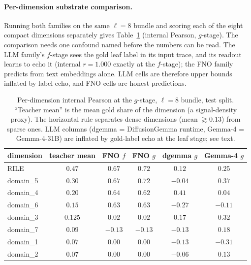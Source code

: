 \paragraph{Per-dimension substrate comparison.} Running both families
on the same $\ell = 8$ bundle and scoring each of the eight compact
dimensions separately gives Table~\ref{tab:qsentence-perdim} (internal
Pearson, $g$-stage). The comparison needs one confound named before
the numbers can be read. The LLM family's $f$-stage sees the gold leaf
label in its input trace, and its readout learns to echo it
(internal $r = 1.000$ exactly at the $f$-stage); the FNO family
predicts from text embeddings alone. LLM cells are therefore
upper bounds inflated by label echo, and FNO cells are honest
predictions.

\begin{table}[htbp]
    \centering
    \begin{tabular}{lccccc}
    \toprule
    dimension & teacher mean & FNO $f$ & FNO $g$ & dgemma $g$ & Gemma-4 $g$ \\
    \midrule
    RILE       & $0.47$  & $0.67$ & $\mathbf{0.72}$ & $0.12$  & $0.25$ \\
    domain\_5  & $0.30$  & $0.67$ & $\mathbf{0.72}$ & $-0.04$ & $0.37$ \\
    domain\_4  & $0.20$  & $0.64$ & $\mathbf{0.62}$ & $0.41$  & $0.04$ \\
    domain\_6  & $0.15$  & $0.63$ & $\mathbf{0.63}$ & $-0.27$ & $-0.11$ \\
    \midrule
    domain\_3  & $0.125$ & $0.02$ & $0.02$  & $0.17$  & $0.32$ \\
    domain\_7  & $0.09$  & $-0.13$ & $-0.13$ & $-0.13$ & $0.18$ \\
    domain\_1  & $0.07$  & $0.00$ & $0.00$  & $-0.13$ & $-0.31$ \\
    domain\_2  & $0.07$  & $0.00$ & $0.00$  & $-0.06$ & $0.13$ \\
    \bottomrule
    \end{tabular}
    \caption{Per-dimension internal Pearson at the $g$-stage, $\ell=8$
    bundle, test split. ``Teacher mean'' is the mean gold share of the
    dimension (a signal-density proxy). The horizontal rule separates
    dense dimensions (mean $\gtrsim 0.13$) from sparse ones. LLM
    columns (dgemma = DiffusionGemma runtime, Gemma-4 = Gemma-4-31B)
    are inflated by gold-label echo at the leaf stage; see text.}
    \label{tab:qsentence-perdim}
\end{table}

